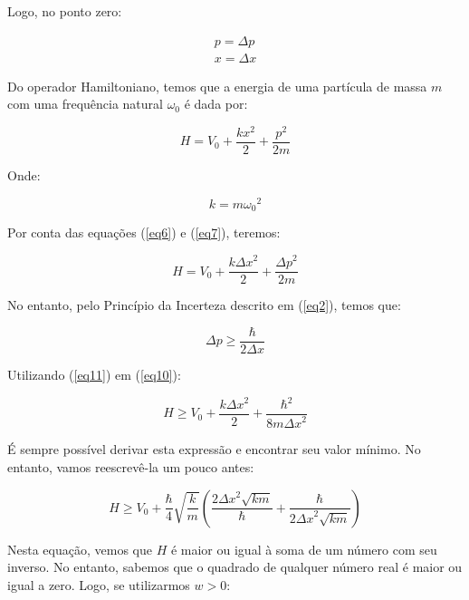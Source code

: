 Logo, no ponto zero:

\begin{eqnarray}
    p = \Delta p  \label{eq6} \\
    x = \Delta x  \label{eq7}
\end{eqnarray}

Do operador Hamiltoniano, temos que a energia de uma partícula de massa $m$ com uma frequência natural ${\omega}_0$ é dada por:

\begin{equation}
    H = V_0 + \frac{k x^2}{2} + \frac{p^2}{2m}
    \label{eq8}
\end{equation}

Onde:

\begin{equation}
    k = m {{\omega}_0}^2
    \label{eq9}
\end{equation}

Por conta das equações (\ref{eq6}) e (\ref{eq7}), teremos:

\begin{equation}
    H = V_0 + \frac{k {\Delta x}^2}{2} + \frac{{\Delta p}^2}{2m}
    \label{eq10}
\end{equation}

No entanto, pelo Princípio da Incerteza descrito em (\ref{eq2}), temos que:

\begin{equation}
    \Delta p \geq \frac{\hbar}{2 \Delta x}
    \label{eq11}
\end{equation}

Utilizando (\ref{eq11}) em (\ref{eq10}):

\begin{equation}
    H \geq V_0 + \frac{k {\Delta x}^2}{2} + \frac{{\hbar}^2}{8m{\Delta x}^2}
    \label{eq12}
\end{equation}

É sempre possível derivar esta expressão e encontrar seu valor mínimo. No entanto, vamos reescrevê-la um pouco antes:

\begin{equation}
    H \geq V_0 + \frac{\hbar}{4}\sqrt{\frac{k}{m}} \left( \frac{2{\Delta x}^2 \sqrt{km}}{\hbar} + \frac{\hbar}{2{\Delta x}^2 \sqrt{km}} \right)
    \label{eq13}
\end{equation}

Nesta equação, vemos que $H$ é maior ou igual à soma de um número com seu inverso. No entanto, sabemos que o quadrado de qualquer número real é maior ou igual a zero. Logo, se utilizarmos $w > 0$:

